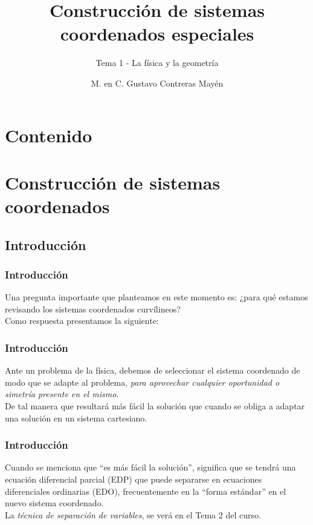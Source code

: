 \documentclass[12pt]{beamer}
\title{\large{Construcción de sistemas coordenados especiales}}
\subtitle{Tema 1 - La física y la geometría}
\author{M. en C. Gustavo Contreras Mayén}
\date{}
\begin{document}
\maketitle
\fontsize{14}{14}\selectfont
{}
\section*{Contenido}
\section{Construcción de sistemas coordenados}
\subsection{Introducción}
\begin{frame}
\frametitle{Introducción}
Una pregunta importante que planteamos en este momento es: ¿para qué estamos revisando los sistemas coordenados curvílineos?
\\
\bigskip
\pause
Como respuesta presentamos la siguiente:
\end{frame}
\begin{frame}
\frametitle{Introducción}
Ante un problema de la física, debemos de seleccionar el sistema coordenado de modo que se adapte al problema, \emph{para aprovechar cualquier oportunidad o simetría presente en el mismo}.
\\
\bigskip
\pause
De tal manera que resultará más fácil la solución que cuando se obliga a adaptar una solución en un sistema cartesiano.
\end{frame}
\begin{frame}
\frametitle{Introducción}
Cuando se menciona que \enquote{es más fácil la solución}, significa que se tendrá una ecuación diferencial parcial (EDP) que puede separarse en ecuaciones diferenciales ordinarias (EDO), frecuentemente en la \enquote{forma estándar} en el nuevo sistema coordenado.
\\
\bigskip
\pause
La \emph{técnica de separación de variables}, se verá en el Tema 2 del curso.
\end{frame}
\end{document}
